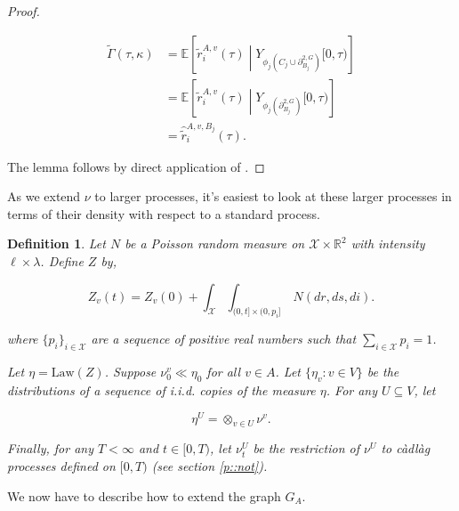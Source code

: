 \documentclass[12pt]{article}
\newcommand{\mb}{\mathbb}
\newcommand{\mc}{\mathcal}
\newcommand{\te}{\text}
\newcommand{\ind}{\hspace{24pt}}
\newcommand{\ex}[1]{\mb{E}\left[#1\right]}			%
\newcommand{\sta}{\mc{X}}							%
\newcommand{\dgneigh}[2]{\partial^{2,#1}_{#2}}		%
\newcommand{\poiss}{N}								%
\newcommand{\leb}{\lambda}							%
\newcommand{\Sm}{\ell}								%
\newcommand{\rate}{r}								%
\newcommand{\vind}[1]{_{#1}}						%
\newcommand{\tme}[1]{(#1)}							%
\newcommand{\tmi}[1]{#1}							%
\newcommand{\vpara}[1]{^{#1}}						%
\newcommand{\stpara}[1]{_{#1}}						%
\newcommand{\tpara}[1]{_{#1}}						%
\newcommand{\gvpara}[2]{^{#1,#2}}					%
\newcommand{\Xg}{Y}									%
\newcommand{\brate}{\alt{\rate}}					%
\newcommand{\alt}[1]{\tilde{#1}}					%
\newcommand{\rt}{\tau}								%
\renewcommand{\mark}{\kappa}						%
\newcommand{\ratee}{\Gamma}							%
\newcommand{\cratee}{\alt{\ratee}}					%
\newcommand{\mm}{\nu}								%
\newcommand{\law}{\te{Law}}							%
\newcommand{\Xh}{Z}									%
\newcommand{\bcrate}{\hat{\brate}}					%
\newcommand{\mmm}{\eta}								%
\newcommand{\gvjpara}[3]{^{#1,#2,#3}}				%
\newtheorem{defn}[thms]{Definition}
\begin{document}
\begin{proof}
\begin{description}
\begin{align*}
\cratee(\rt,\mark) &= \ex{\brate\gvpara{A}{v}\stpara{i}(\rt)\middle|\Xg\vind{\phi_j\left(C_j\cup\dgneigh{G}{B_j}\right)}\tmi{[0,\rt)}}\\
&= \ex{\brate\gvpara{A}{v}\stpara{i}(\rt)\middle|\Xg\vind{\phi_j\left(\dgneigh{G}{B_j}\right)}\tmi{[0,\rt)}}\\
&= \bcrate\gvjpara{A}{v}{B_j}\stpara{i}\tme{\rt}.
\end{align*}
\end{description}

The lemma follows by direct application of \cite[Exercise 14.7.1]{DalVer08}.
\end{proof}

As we extend \(\mm\) to larger processes, it's easiest to look at these larger processes in terms of their density with respect to a standard process.

\begin{defn}
Let \(\poiss\) be a Poisson random measure on \(\sta\times\mb{R}^2\) with intensity \(\Sm\times\leb\). Define \(\Xh\) by,

\[\Xh\vind{v}\tme{t} = \Xh\vind{v}\tme{0} + \int_{\sta}\int_{(0,t]\times (0,p_i]}\,\poiss(dr,ds,di).\]

where \(\{p_i\}_{i\in \sta}\) are a sequence of positive real numbers such that \(\sum_{i\in \sta}p_i = 1\). 

\ind Let \(\mmm = \law(\Xh)\). Suppose \(\mm\vpara{v}\tpara{0}\ll\mmm\tpara{0}\) for all \(v\in A\). Let \(\{\mmm\vind{v}:v\in V\}\) be the distributions of a sequence of i.i.d. copies of the measure \(\mmm\). For any \(U\subseteq V\), let 

\[\mmm\vpara{U} = \otimes_{v\in U} \mm\vpara{v}.\]

Finally, for any \(T < \infty\) and \(t\in [0,T)\), let \(\mm\vpara{U}\tpara{t}\) be the restriction of \(\mm\vpara{U}\) to c\`adl\`ag processes defined on \([0,T)\) (see section \ref{p::not}).
\label{Uq::eta}
\end{defn}

We now have to describe how to extend the graph \(G\vind{A}\).
\end{document}
